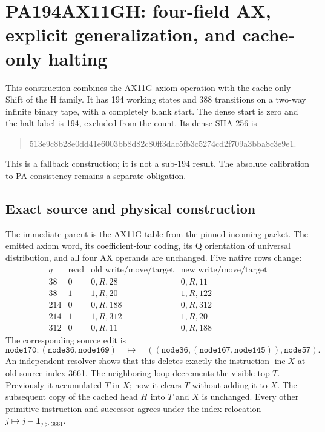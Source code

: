 \section{PA194AX11GH: four-field AX, explicit generalization, and cache-only halting}
\label{sec:ax11gh}

This construction combines the AX11G axiom operation with the cache-only
Shift of the H family. It has 194 working states and 388 transitions on a
two-way infinite binary tape, with a completely blank start. The dense
start is zero and the halt label is 194, excluded from the count. Its
dense SHA-256 is
\begin{quote}\small\ttfamily
513e9c8b28e0dd41e6003bb8d82c80ff3dac5fb3c5274cd2f709a3bba8c3e9e1.
\end{quote}
This is a fallback construction; it is not a sub-194 result.
The absolute calibration to PA consistency remains a separate obligation.

\subsection{Exact source and physical construction}

The immediate parent is the AX11G table from the pinned incoming packet.
The emitted axiom word, its coefficient-four coding, its Q orientation of
universal distribution, and all four AX operands are unchanged.
Five native rows change:
\[
\begin{array}{c|c|c|c}
q&\text{read}&\text{old write/move/target}&\text{new write/move/target}\\\hline
38&0&0,R,28&0,R,11\\
38&1&1,R,20&1,R,122\\
214&0&0,R,188&0,R,312\\
214&1&1,R,312&1,R,20\\
312&0&0,R,11&0,R,188
\end{array}
\]
The corresponding source edit is
\[
\texttt{node170}: (\texttt{node36},\texttt{node169})
\quad\longmapsto\quad
((\texttt{node36},(\texttt{node167},\texttt{node145})),\texttt{node57}).
\]
An independent resolver shows that this deletes exactly the instruction
$\operatorname{inc}X$ at old source index 3661. The neighboring loop
decrements the visible top $T$. Previously it accumulated $T$ in $X$;
now it clears $T$ without adding it to $X$. The subsequent copy of the
cached head $H$ into $T$ and $X$ is unchanged. Every other primitive
instruction and successor agrees under the index relocation
$j\mapsto j-\mathbf1_{j>3661}$.

